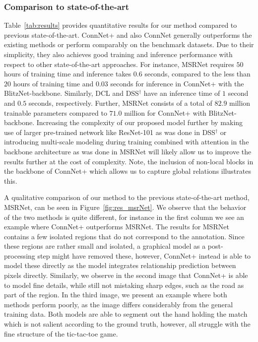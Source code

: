 \documentclass[journal]{IEEEtran}
\begin{document}
\subsubsection{Comparison to state-of-the-art}
Table~\ref{tab:results} provides quantitative results for our method compared to previous state-of-the-art. ConnNet+ and also ConnNet generally outperforms the existing methods or perform comparably on the benchmark datasets. Due to their simplicity, they also achieves good training and inference performance with respect to other state-of-the-art approaches. For instance, MSRNet requires $50$ hours of training time and inference takes $0.6$ seconds, compared to the less than $20$ hours of training time and $0.03$ seconds for inference in ConnNet+ with the BlitzNet-backbone. Similarly, DCL and DSS$^\dagger$ have an inference time of $1$ second and $0.5$ seconds, respectively.
Further, MSRNet consists of a total of $82.9$ million trainable parameters compared to $71.0$ million for ConnNet+ with BlitzNet-backbone. Increasing the complexity of our proposed model further by making use of larger pre-trained network like ResNet-101 as was done in DSS$^\dagger$ or introducing multi-scale modeling during training combined with attention in the backbone architecture as was done in MSRNet will likely allow us to improve the results further at the cost of complexity. Note, the inclusion of non-local blocks in the backbone of ConnNet+ which allows us to capture global relations illustrates this.

A qualitative comparison of our method to the previous state-of-the-art method, MSRNet, can be seen in Figure~\ref{fig:res_msrNet}. We observe that the behavior of the two methods is quite different, for instance in the first column we see an example where ConnNet+ outperforms MSRNet. The results for MSRNet contains a few isolated regions that do not correspond to the annotation. Since these regions are rather small and isolated, a graphical model as a post-processing step might have removed these, however, ConnNet+ instead is able to model these directly as the model integrates relationship prediction between pixels directly. Similarly, we observe in the second image that ConnNet+ is able to model fine details, while still not mistaking sharp edges, such as the road as part of the region. In the third image, we present an example where both methods perform poorly, as the image differs considerably from the general training data. Both models are able to segment out the hand holding the match which is not salient according to the ground truth, however, all struggle with the fine structure of the tic-tac-toe game.
\end{document}
